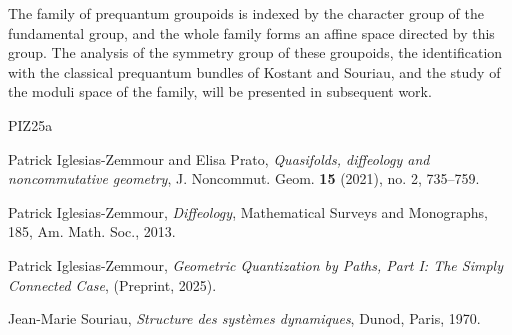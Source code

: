 \documentclass[11pt,reqno,letterpaper,twoside]{amsart}
\begin{document}
  The family of prequantum groupoids is indexed by the character group of the fundamental group,
  and the whole family forms an affine space directed by this group.
  The analysis of the symmetry group of these groupoids,
  the identification with the classical prequantum bundles of Kostant and Souriau,
  and the study of the moduli space of the family,
  will be presented in subsequent work.
  
  
  \begin{thebibliography}{PIZ25a}
    
    Patrick Iglesias-Zemmour and Elisa Prato,
    \emph{Quasifolds, diffeology and noncommutative geometry},
    J. Noncommut. Geom. \textbf{15} (2021), no. 2, 735--759.
    
    Patrick Iglesias-Zemmour,
    \emph{Diffeology},
    Mathematical Surveys and Monographs, 185, Am. Math. Soc., 2013.
    
    Patrick Iglesias-Zemmour,
    \emph{Geometric Quantization by Paths, Part I: The Simply Connected Case},
    (Preprint, 2025).
    
    Jean-Marie Souriau,
    \emph{Structure des systèmes dynamiques},
    Dunod, Paris, 1970.
    
  \end{thebibliography}
  
  
\end{document}
